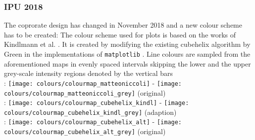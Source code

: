 \documentclass[short,comm,dots]{ipureport}
\begin{document}
\subsubsection{IPU 2018}
The coprorate design has changed in November 2018 and a new colour scheme has to be created: The colour scheme used for plots is based on the works of Kindlmann et al.
. It is created by modifying the existing cubehelix algorithm by Green
 in the implementations of \texttt{matplotlib}
 . Line colours are sampled from the aforementioned maps in evenly spaced intervals skipping the lower and the upper grey-scale intensity regions denoted by the vertical bars%
\newcommand\hheight{0.75}\\
:
\texttt{[image: colours/colourmap\_matteoniccoli]} - 
\texttt{[image: colours/colourmap\_matteoniccoli\_grey]} (original) \\
:
\texttt{[image: colours/colourmap\_cubehelix\_kindl]} - 
\texttt{[image: colours/colourmap\_cubehelix\_kindl\_grey]} (adaption) \\
:
\texttt{[image: colours/colourmap\_cubehelix\_alt]} - 
\texttt{[image: colours/colourmap\_cubehelix\_alt\_grey]} (original)%



\end{document}
